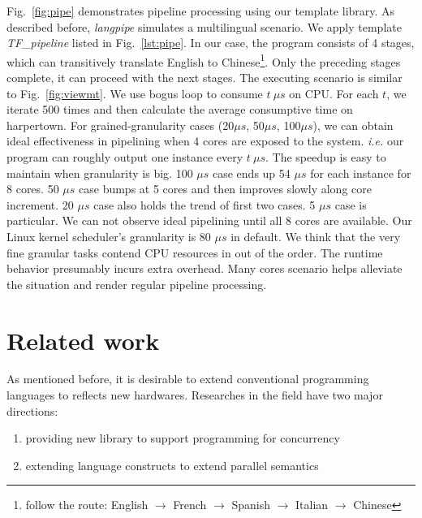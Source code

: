 \documentclass[10pt, conference, compsocconf]{IEEEtran}
\begin{document}
Fig.~\ref{fig:pipe} demonstrates pipeline processing using our
template library. As described before, \textit{langpipe} simulates a
multilingual scenario. We apply template \emph{TF\_pipeline} listed in
Fig.~\ref{lst:pipe}. In our case, the program consists of  4 stages,
which can transitively translate English to Chinese\footnote{follow the 
  route: English  $\to$ French $\to$ Spanish $\to$ Italian $\to$
  Chinese}. Only the preceding stages complete,  it can proceed with
the next stages. The executing scenario is similar to Fig.~\ref{fig:viewmt}. We use bogus loop to consume $t \  \mu s$ on CPU. For each $t$, we iterate 500
times and then calculate the average consumptive time on harpertown. For
grained-granularity cases (20$\mu s$, 50$\mu s$, 100$\mu s$), we can obtain ideal
effectiveness in pipelining when 4 cores are exposed to the system.
\textit{i.e.} our program can roughly output one instance every $t\  \mu
s$. The speedup is easy to maintain when granularity is big. 100 $\mu s$ case ends up 54 $\mu s$ for each instance for 8 cores. 50  $\mu s$ case
bumps at 5 cores and then improves slowly along core increment. 20
$\mu s$ case also holds the trend of first two cases. 5 $\mu s$ case is
particular. We can not observe ideal pipelining until all 8
cores are available.  Our Linux kernel scheduler's granularity is 80
$\mu s$ in default. We think that the very fine granular tasks contend
CPU resources in out of the order. The runtime behavior presumably
incurs extra overhead. Many cores scenario helps alleviate the
situation and render regular pipeline processing.

\section{Related work}
As mentioned before, it is desirable to extend conventional programming languages to reflects new hardwares. Researches in the field have two major directions:
\begin{enumerate}
\item providing new library to support programming for concurrency
\item extending language constructs to extend parallel semantics
\end{enumerate}
\end{document}
